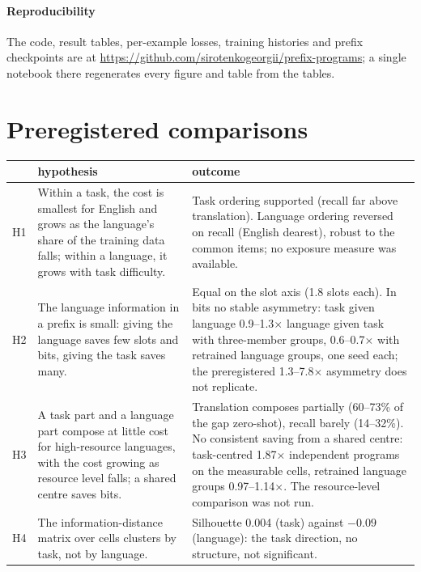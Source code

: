 \documentclass{article}
\begin{document}
\paragraph{Reproducibility}
The code, result tables, per-example losses, training histories and prefix checkpoints are at \url{https://github.com/sirotenkogeorgii/prefix-programs}; a single notebook there regenerates every figure and table from the tables.





\clearpage
\appendix
\FloatBarrier
\section{Preregistered comparisons}\label{app:prereg}
\begin{table}[H]
\centering\small
\begin{tabular}{p{}p{}p{}}
\toprule
 & hypothesis & outcome \\
\midrule
H1 & Within a task, the cost is smallest for English and grows as the language's share of the training data falls; within a language, it grows with task difficulty. & Task ordering supported (recall far above translation). Language ordering reversed on recall (English dearest), robust to the common items; no exposure measure was available. \\
H2 & The language information in a prefix is small: giving the language saves few slots and bits, giving the task saves many. & Equal on the slot axis (1.8 slots each). In bits no stable asymmetry: task given language 0.9--1.3$\times$ language given task with three-member groups, 0.6--0.7$\times$ with retrained language groups, one seed each; the preregistered 1.3--7.8$\times$ asymmetry does not replicate. \\
H3 & A task part and a language part compose at little cost for high-resource languages, with the cost growing as resource level falls; a shared centre saves bits. & Translation composes partially (60--73\% of the gap zero-shot), recall barely (14--32\%). No consistent saving from a shared centre: task-centred 1.87$\times$ independent programs on the measurable cells, retrained language groups 0.97--1.14$\times$. The resource-level comparison was not run. \\
H4 & The information-distance matrix over cells clusters by task, not by language. & Silhouette 0.004 (task) against $-0.09$ (language): the task direction, no structure, not significant. \\

\end{tabular}
\end{table}
\end{document}
